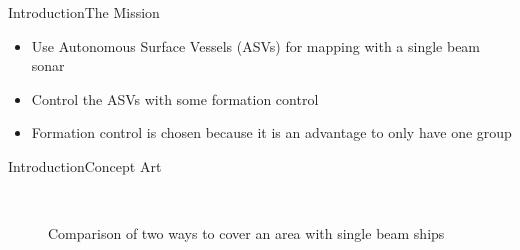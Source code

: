 \documentclass[10pt,handout]{beamer}
\begin{document}
\begin{frame}{Introduction}{The Mission}
\begin{itemize}
\item Use Autonomous Surface Vessels (ASVs) for mapping with a single beam sonar
\item Control the ASVs with some formation control
\item Formation control is chosen because it is an advantage to only have one group
\end{itemize}
\end{frame}

\begin{frame}{Introduction}{Concept Art}
\begin{figure}
  \centering
  \ %
  \caption{Comparison of two ways to cover an area with single beam ships}
  \label{fig:concept-art}
\end{figure}
\end{frame}

\end{document}
